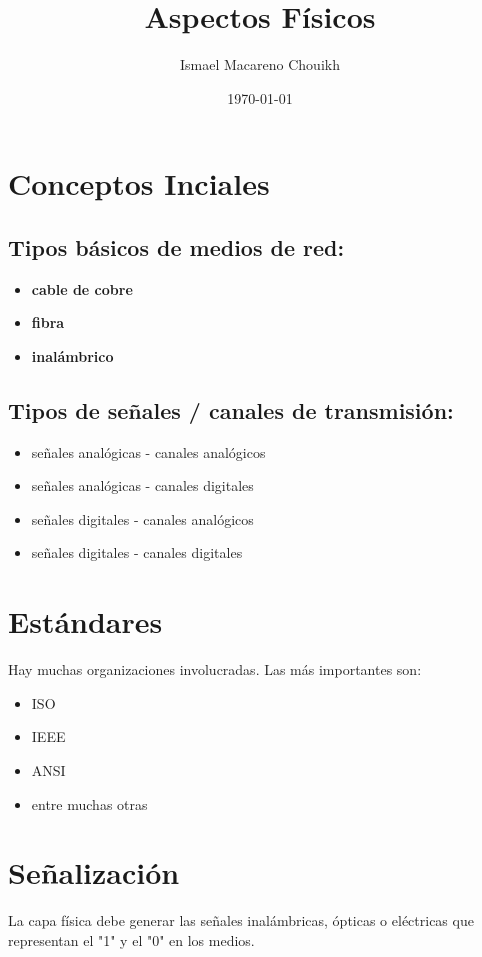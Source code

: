 \documentclass[11pt]{article}
\author{Ismael Macareno Chouikh}
\date{\today}
\title{Aspectos Físicos}
\newcommand\blankpage{\null\thispagestyle{empty}\newpage}
\begin{document}
\maketitle
\tableofcontents

\blankpage

\section{Conceptos Inciales}
\label{sec:orgc76c7a0}
\subsection{Tipos básicos de medios de red:}
\label{sec:orgfb04d40}
\begin{itemize}
\item \textbf{cable de cobre}
\item \textbf{fibra}
\item \textbf{inalámbrico}
\end{itemize}

\subsection{Tipos de señales / canales de transmisión:}
\label{sec:org7c6f46f}
\begin{itemize}
\item señales analógicas - canales analógicos
\item señales analógicas - canales digitales
\item señales digitales - canales analógicos
\item señales digitales - canales digitales
\end{itemize}

\section{Estándares}
\label{sec:org8467717}
Hay muchas organizaciones involucradas. Las más importantes son:
\begin{itemize}
\item ISO
\item IEEE
\item ANSI
\item entre muchas otras
\end{itemize}

\section{Señalización}
\label{sec:org8a4f6ca}
La capa física debe generar las señales inalámbricas, ópticas o eléctricas que representan el "1" y el "0" en los medios.
\end{document}
